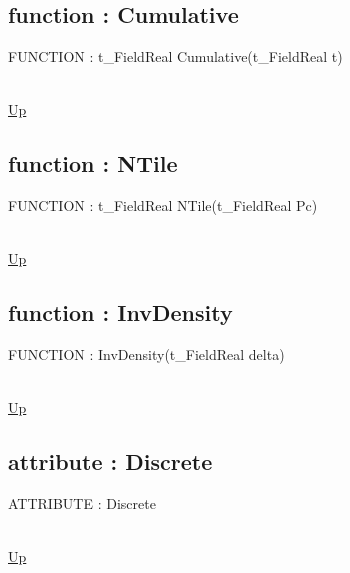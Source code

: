 \subsection*{function : Cumulative}
\hypertarget{ecldoc:linearregression.ols.distributionbase.cumulative}{FUNCTION : t\_FieldReal Cumulative(t\_FieldReal t)} \\
\hyperlink{ecldoc:linearregression.ols.distributionbase}{Up} \\
\par
\subsection*{function : NTile}
\hypertarget{ecldoc:linearregression.ols.distributionbase.ntile}{FUNCTION : t\_FieldReal NTile(t\_FieldReal Pc)} \\
\hyperlink{ecldoc:linearregression.ols.distributionbase}{Up} \\
\par
\subsection*{function : InvDensity}
\hypertarget{ecldoc:linearregression.ols.distributionbase.invdensity}{FUNCTION : InvDensity(t\_FieldReal delta)} \\
\hyperlink{ecldoc:linearregression.ols.distributionbase}{Up} \\
\par
\subsection*{attribute : Discrete}
\hypertarget{ecldoc:linearregression.ols.distributionbase.discrete}{ATTRIBUTE : Discrete} \\
\hyperlink{ecldoc:linearregression.ols.distributionbase}{Up} \\
\par

